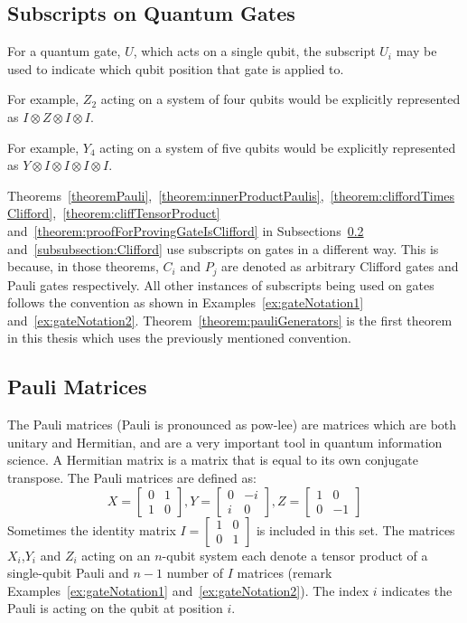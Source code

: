 \subsection{Subscripts on Quantum Gates}
For a quantum gate, $U$, which acts on a single qubit, the subscript $U_i$ may be used to indicate which qubit position that gate is applied to. 
\begin{example}
\label{ex:gateNotation1}
For example, $Z_2$ acting on a system of four qubits would be explicitly represented as $I \otimes Z \otimes I \otimes I$.
\end{example}
\begin{example}
\label{ex:gateNotation2}
For example, $Y_4$ acting on a system of five qubits would be explicitly represented as $Y \otimes I \otimes I \otimes I \otimes I$.
\end{example}
Theorems~\ref{theoremPauli},~\ref{theorem:innerProductPaulis},~\ref{theorem:cliffordTimesClifford},~\ref{theorem:cliffTensorProduct} and~\ref{theorem:proofForProvingGateIsClifford} in Subsections~\ref{subsubsection:paulis} and~\ref{subsubsection:Clifford} use subscripts on gates in a different way. This is because, in those theorems, $C_i$ and $P_j$ are denoted as arbitrary Clifford gates and Pauli gates respectively. All other instances of subscripts being used on gates follows the convention as shown in Examples~\ref{ex:gateNotation1} and~\ref{ex:gateNotation2}. Theorem~\ref{theorem:pauliGenerators} is the first theorem in this thesis which uses the previously mentioned convention.

\subsection{Pauli Matrices}
\label{subsubsection:paulis}
The Pauli matrices (Pauli is pronounced as pow-lee) are matrices which are both unitary and Hermitian, and are a very important tool in quantum information science. A Hermitian matrix is a matrix that is equal to its own conjugate transpose. The Pauli matrices are defined as:
$$X = \begin{bmatrix} 0 & 1 \\ 1 & 0\end{bmatrix}, Y = \begin{bmatrix} 0 & -i \\ i & 0\end{bmatrix}, Z =  \begin{bmatrix} 1 & 0 \\ 0 & -1\end{bmatrix}$$
Sometimes the identity matrix $I = \begin{bmatrix} 1 & 0 \\ 0 & 1\end{bmatrix}$ is included in this set. The matrices $X_i$,$Y_i$ and $Z_i$ acting on an $n$-qubit system each denote a tensor product of a single-qubit Pauli and $n-1$ number of $I$ matrices (remark Examples~\ref{ex:gateNotation1} and~\ref{ex:gateNotation2}). The index $i$ indicates the Pauli is acting on the qubit at position $i$.

